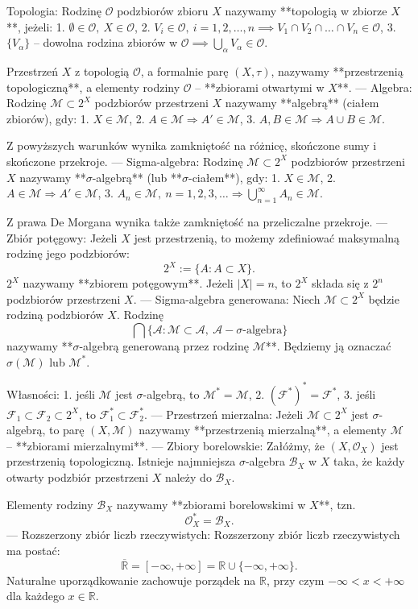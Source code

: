 Topologia:
Rodzinę $\mathcal{O}$ podzbiorów zbioru $X$ nazywamy **topologią w zbiorze $X$**, jeżeli:
1. $\emptyset \in \mathcal{O},\ X \in \mathcal{O}$,
2. $V_i \in \mathcal{O},\ i = 1, 2, \dots, n \implies V_1 \cap V_2 \cap \dots \cap V_n \in \mathcal{O}$,
3. $\{V_\alpha\}$ – dowolna rodzina zbiorów w $\mathcal{O} \implies \bigcup_\alpha V_\alpha \in \mathcal{O}$.

Przestrzeń $X$ z topologią $\mathcal{O}$, a formalnie parę $(X, \tau)$, nazywamy **przestrzenią topologiczną**, a elementy rodziny $\mathcal{O}$ – **zbiorami otwartymi w $X$**.
---
Algebra:
Rodzinę $\mathcal{M} \subset 2^X$ podzbiorów przestrzeni $X$ nazywamy **algebrą** (ciałem zbiorów), gdy:
1. $X \in \mathcal{M}$,
2. $A \in \mathcal{M} \Rightarrow A' \in \mathcal{M}$,
3. $A, B \in \mathcal{M} \Rightarrow A \cup B \in \mathcal{M}$.

Z powyższych warunków wynika zamkniętość na różnicę, skończone sumy i skończone przekroje.
---
Sigma-algebra:
Rodzinę $\mathcal{M} \subset 2^X$ podzbiorów przestrzeni $X$ nazywamy **$\sigma$-algebrą** (lub **$\sigma$-ciałem**), gdy:
1. $X \in \mathcal{M}$,
2. $A \in \mathcal{M} \Rightarrow A' \in \mathcal{M}$,
3. $A_n \in \mathcal{M},\ n = 1, 2, 3, \dots \Rightarrow \bigcup_{n=1}^\infty A_n \in \mathcal{M}$.

Z prawa De Morgana wynika także zamkniętość na przeliczalne przekroje.
---
Zbiór potęgowy:
Jeżeli $X$ jest przestrzenią, to możemy zdefiniować maksymalną rodzinę jego podzbiorów:
$$2^X := \{A : A \subset X\}.$$
$2^X$ nazywamy **zbiorem potęgowym**. Jeżeli $|X| = n$, to $2^X$ składa się z $2^n$ podzbiorów przestrzeni $X$.
---
Sigma-algebra generowana:
Niech $\mathcal{M} \subset 2^X$ będzie rodziną podzbiorów $X$. Rodzinę
$$\bigcap \{\mathcal{A} : \mathcal{M} \subset \mathcal{A},\ \mathcal{A} - \sigma\text{-algebra}\}$$
nazywamy **$\sigma$-algebrą generowaną przez rodzinę $\mathcal{M}$**. Będziemy ją oznaczać $\sigma(\mathcal{M})$ lub $\mathcal{M}^*$.

Własności:
1. jeśli $\mathcal{M}$ jest $\sigma$-algebrą, to $\mathcal{M}^* = \mathcal{M}$,
2. $(\mathcal{F}^*)^* = \mathcal{F}^*$,
3. jeśli $\mathcal{F}_1 \subset \mathcal{F}_2 \subset 2^X$, to $\mathcal{F}_1^* \subset \mathcal{F}_2^*$.
---
Przestrzeń mierzalna:
Jeżeli $\mathcal{M} \subset 2^X$ jest $\sigma$-algebrą, to parę $(X, \mathcal{M})$ nazywamy **przestrzenią mierzalną**, a elementy $\mathcal{M}$ – **zbiorami mierzalnymi**.
---
Zbiory borelowskie:
Załóżmy, że $(X, \mathcal{O}_X)$ jest przestrzenią topologiczną. Istnieje najmniejsza $\sigma$-algebra $\mathcal{B}_X$ w $X$ taka, że każdy otwarty podzbiór przestrzeni $X$ należy do $\mathcal{B}_X$.

Elementy rodziny $\mathcal{B}_X$ nazywamy **zbiorami borelowskimi w $X$**, tzn.
$$\mathcal{O}_X^* = \mathcal{B}_X.$$
---
Rozszerzony zbiór liczb rzeczywistych:
Rozszerzony zbiór liczb rzeczywistych ma postać:
$$\overline{\mathbb{R}} = [-\infty, +\infty] = \mathbb{R} \cup \{-\infty, +\infty\}.$$
Naturalne uporządkowanie zachowuje porządek na $\mathbb{R}$, przy czym $-\infty < x < +\infty$ dla każdego $x \in \mathbb{R}$.
